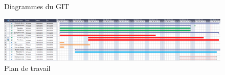 \documentclass[12pt]{report}
\begin{document}
\begin{center}
\begin{figure}
    \begin{minipage}[t]{8cm}
        \centering
    \end{minipage}\hfill
    \begin{minipage}[t]{8cm}
        \centering
    \end{minipage}
    \caption{\label{git} Diagrammes du GIT}
\end{figure}
\end{center}

\begin{figure}[H]
\centering
\includegraphics[angle=270, scale = 0.45]{plan_de_travail.PNG}
\caption{\label{plan} Plan de travail}
\end{figure}
\end{document}
